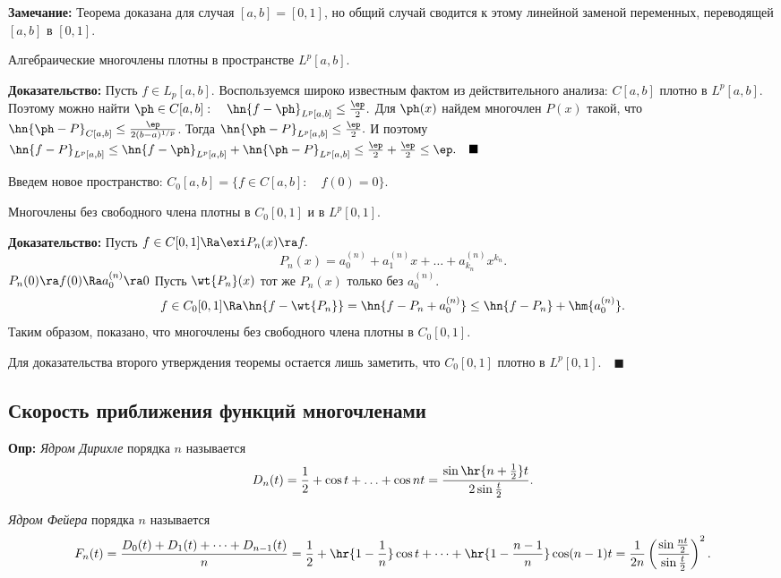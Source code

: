 \documentclass{article}
\begin{document}
\noindent\textbf{Замечание:} Теорема доказана для случая
$[a,b]=[0,1]$, но общий случай сводится к этому линейной заменой
переменных, переводящей $[a,b]$ в $[0,1]$.

\begin{theorem} Алгебраические многочлены плотны в
пространстве $L^p[a,b]$.
\end{theorem}
\textbf{Доказательство:} Пусть $f\in L_p[a,b]$. Воспользуемся
широко известным фактом из действительного анализа: $C[a,b]$
плотно в $L^p[a,b]$. Поэтому можно найти $\ph\in C[a,b]:\quad
\hn{f-\ph}_{L^p[a,b]}\le\frac{\ep}{2}.$ Для $\ph(x)$
найдем многочлен $P(x)$ такой, что
$\hn{\ph-P}_{C[a,b]}\le\frac{\ep}{2(b-a)^{1/p}}$. Тогда
$\hn{\ph-P}_{L^p[a,b]}\le\frac{\ep}2.$ И поэтому
$\hn{f-P}_{L^p[a,b]}\le\hn{f-\ph}_{L^p[a,b]}+\hn{\ph-P}_{L^p[a,b]}\le\frac{\ep}2+\frac{\ep}2\le\ep.\quad\blacksquare$

\medskip Введем новое пространство: $C_0[a,b]=\{f\in C[a,b]:\quad f(0)=0\}$.

\begin{theorem}
Многочлены без свободного члена плотны в $C_0[0,1]$ и в
$L^p[0,1]$.
\end{theorem}
\textbf{Доказательство:} Пусть $f\in C[0,1]\Ra\exi
P_n(x)\ra f.$
$$P_n(x)=a_0^{(n)}+a_1^{(n)}x+\ldots+a_{k_n}^{(n)}x^{k_n}.$$
$P_n(0)\ra f(0)\Ra a_0^{(n)}\ra 0$ Пусть
$\wt{P_n}(x)$ тот же $P_n(x)$ только без $a_0^{(n)}$.
$$f\in
C_0[0,1]\Ra\hn{f-\wt{P_n}}=\hn{f-P_n+a_0^{(n)}}\le\hn{f-P_n}+\hm{a_0^{(n)}}.$$
Таким образом, показано, что многочлены без свободного члена
плотны в $C_0[0,1].$

Для доказательства второго утверждения теоремы остается лишь
заметить, что $C_0[0,1]$ плотно в $L^p[0,1].\quad\blacksquare$

\subsection{Скорость приближения функций многочленами}
\textbf{Опр:} \emph{Ядром Дирихле} порядка $n$ называется
$$D_n(t)=\frac12+\cos t+\ldots+\cos nt=\frac{\sin\hr{n+\frac12}t}{2\sin \frac t2}.$$

\begin{df}
  \emph{Ядром Фейера} порядка $n$ называется
  \begin{multline*}
    F_n(t)=\frac{D_0(t)+D_1(t)+\dots+D_{n-1}(t)}{n}=\frac12+\hr{1-\frac1n}\cos
    t+\dots+\hr{1-\frac{n-1}{n}}\cos
    (n-1)t=\frac1{2n}\left(\frac{\sin \frac{nt}2}{\sin\frac t2}\right)^2.
  \end{multline*}
\end{df}
\end{document}
